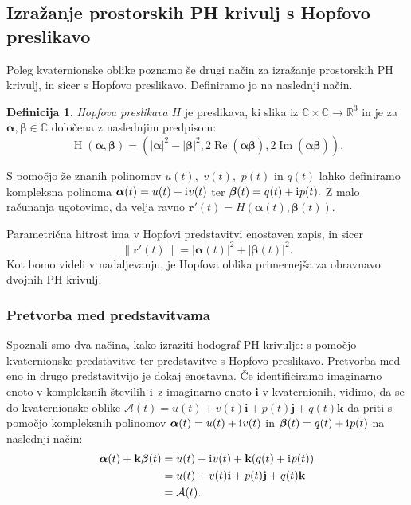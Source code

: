 \documentclass[12pt,a4paper,twoside]{article}
\newcommand{\iu}{\mathrm{i}\mkern1mu} %
\theoremstyle{definition} %
\newtheorem{definicija}{Definicija}[section]
\theoremstyle{plain} %
\theoremstyle{primerstyle}
\numberwithin{equation}{section}  %
\newcommand{\R}{\mathbb R}
\renewcommand{\C}{\mathbb C}
\newcommand{\rV}{\mathbf{r}}
\newcommand{\iV}{\mathbf{i}}
\newcommand{\jV}{\mathbf{j}}
\newcommand{\kV}{\mathbf{k}}
\newcommand{\AQ}{\mathcal{A}}
\newcommand{\balpha}{\boldsymbol \alpha}
\newcommand{\bbeta}{\boldsymbol \beta}
\DeclareMathOperator{\hopf}{H}
\DeclareMathOperator{\ReC}{Re}
\DeclareMathOperator{\ImC}{Im}
\begin{document}
\subsection{Izražanje prostorskih PH krivulj s Hopfovo preslikavo}
\label{hopf_poglavje}

Poleg kvaternionske oblike poznamo še drugi način za izražanje prostorskih PH krivulj, in sicer s Hopfovo preslikavo. Definiramo jo na naslednji način.
\begin{definicija}
	\label{hopf_def}
	\emph{Hopfova preslikava} $H$ je preslikava, ki slika iz $\C \times \C \to \R^3$ in je za $\balpha, \bbeta \in \C$ določena z naslednjim predpisom:
	\begin{equation}
		\label{hopf}
		\hopf(\balpha, \bbeta)=(|\balpha|^2-|\bbeta|^2,2\ReC(\balpha \bar{\bbeta}),2\ImC(\balpha \bar{\bbeta})).
	\end{equation}
\end{definicija}
S pomočjo že znanih polinomov $u(t),$ $v(t),$ $p(t)$ in $q(t)$ lahko definiramo kompleksna polinoma $\balpha(t)=u(t)+\iu v(t)$ ter $\bbeta(t)=q(t)+\iu p(t).$ Z malo računanja ugotovimo, da velja ravno $\rV'(t)=H(\balpha(t),\bbeta(t)).$

Parametrična hitrost ima v Hopfovi predstavitvi enostaven zapis, in sicer $$\lVert \rV'(t) \rVert=|\balpha(t)|^2+|\bbeta(t)|^2.$$ Kot bomo videli v nadaljevanju, je Hopfova oblika primernejša za obravnavo dvojnih PH krivulj.

\subsubsection{Pretvorba med predstavitvama}

Spoznali smo dva načina, kako izraziti hodograf PH krivulje: s pomočjo kvaternionske predstavitve ter predstavitve s Hopfovo preslikavo. Pretvorba med eno in drugo predstavitvijo je dokaj enostavna. Če identificiramo imaginarno enoto v kompleksnih številih $\iu$ z imaginarno enoto $\iV$ v kvaternionih, vidimo, da se do kvaternionske oblike $\AQ(t)=u(t)+v(t)\iV+p(t)\jV+q(t)\kV$ da priti s pomočjo kompleksnih polinomov $\balpha(t)=u(t)+\iu v(t)$ in $\bbeta(t)=q(t)+\iu p(t)$ na naslednji način:
\begin{align}
	\balpha(t)+\kV\bbeta(t) &= u(t)+\iu v(t)+\kV(q(t)+ \iu p(t)) \nonumber \\
	&=u(t)+v(t)\iV + p(t)\jV+ q(t)\kV \label{comp_to_quat} \\
	&= \AQ(t).\nonumber
\end{align}
\end{document}
